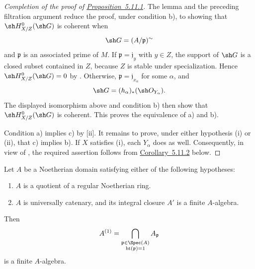 \begin{proof}[Completion of the proof of {\hyperlink{ega4.c04.prop.5-11-1}{Proposition~5.11.1}}]
The lemma and the preceding filtration argument reduce the proof,
under condition {\rm b)}, to showing that
$\sh H^0_{X/Z}(\sh G)$ is coherent when
\[
  \sh G=(A/\mathfrak p)^{\sim}
\]
and $\mathfrak p$ is an associated prime of $M$.  If
$\mathfrak p=\mathfrak j_y$ with $y\in Z$, the support of
$\sh G$ is a closed subset contained in $Z$, because $Z$ is
stable under specialization.  Hence
$\sh H^0_{X/Z}(\sh G)=0$ by .  Otherwise,
$\mathfrak p=\mathfrak j_{x_\alpha}$ for some $\alpha$, and
\[
  \sh G=(h_\alpha)_*(\sh O_{Y_\alpha}).
\]
The displayed isomorphism above and condition {\rm b)} then show
that $\sh H^0_{X/Z}(\sh G)$ is coherent.  This proves the
equivalence of {\rm a)} and {\rm b)}.

Condition {\rm a)} implies {\rm c)} by
[ii].  It remains to prove, under either
hypothesis {\rm(i)} or {\rm(ii)}, that {\rm c)} implies {\rm b)}.
If $X$ satisfies {\rm(i)}, each $Y_\alpha$ does as well.
Consequently, in view of , the required
assertion follows from {\hyperlink{ega4.c04.cor.5-11-2}{Corollary~5.11.2}} below.
\end{proof}

\begin{corollary}[5.11.2]
\label{IV.5.11.2}
Let $A$ be a Noetherian domain satisfying either of the following
hypotheses:
\begin{enumerate}[{\rm(i)}]
  \item $A$ is a quotient of a regular Noetherian ring.
  \item $A$ is universally catenary, and its integral closure
  $A'$ is a finite $A$-algebra.
\end{enumerate}
Then
\[
  A^{(1)}
  =\bigcap_{\substack{\mathfrak p\in\Spec(A)\\
                      \operatorname{ht}(\mathfrak p)=1}}
    A_{\mathfrak p}
\]
is a finite $A$-algebra.
\end{corollary}

